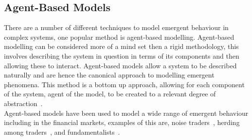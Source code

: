 \documentclass{article}
\begin{document}
\subsection{Agent-Based Models}
There are a number of different techniques to model emergent behaviour in complex systems, one popular method is agent-based modelling. Agent-based modelling can be considered more of a mind set then a rigid methodology, this involves describing the system in question in terms of its components and then allowing these to interact. Agent-based models allow a system to be described naturally and are hence the canonical approach to modelling emergent phenomena. This method is a bottom up approach, allowing for each component of the system, agent of the model, to be created to a relevant degree of abstraction~\cite{abmhumsystems}.\\
Agent-based models have been used to model a wide range of emergent behaviour including in the financial markets, examples of this are, noise traders~\cite{abmnoisetraders}, herding among traders~\cite{abmherding}, and fundamentalists~\cite{abmfundemetilists}.
\end{document}
